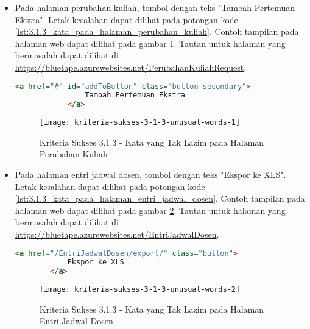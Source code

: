 \begin{itemize}
    \item Pada halaman perubahan kuliah, tombol dengan teks "Tambah Pertemuan Ekstra". Letak kesalahan dapat dilihat pada potongan kode \ref{lst:3.1.3_kata_pada_halaman_perubahan_kuliah}. Contoh tampilan pada halaman web dapat dilihat pada gambar \ref{fig:3.1.3_unusual_words_1}. Tautan untuk halaman yang bermasalah dapat dilihat di \url{https://bluetape.azurewebsites.net/PerubahanKuliahRequest}.
    \begin{lstlisting}[frame=single, label={lst:3.1.3_kata_pada_halaman_perubahan_kuliah}, language=HTML, caption=Kriteria Sukses 3.1.3 - Kata yang Tak Lazim pada Halaman Perubahan Kuliah]
            <a href="#" id="addToButton" class="button secondary">
                Tambah Pertemuan Ekstra
            </a>
    \end{lstlisting}
    
    \begin{figure}[H]
        \centering  
        \texttt{[image: kriteria-sukses-3-1-3-unusual-words-1]}  
        \caption[Kriteria Sukses 3.1.3 - Kata yang Tak Lazim pada Halaman Perubahan Kuliah]{Kriteria Sukses 3.1.3 - Kata yang Tak Lazim pada Halaman Perubahan Kuliah}
        \label{fig:3.1.3_unusual_words_1}  
    \end{figure}
    
    \item Pada halaman entri jadwal dosen, tombol dengan teks "Ekspor ke XLS". Letak kesalahan dapat dilihat pada potongan kode \ref{lst:3.1.3_kata_pada_halaman_entri_jadwal_dosen}. Contoh tampilan pada halaman web dapat dilihat pada gambar \ref{fig:3.1.3_unusual_words_2}. Tautan untuk halaman yang bermasalah dapat dilihat di \url{https://bluetape.azurewebsites.net/EntriJadwalDosen}.
    \begin{lstlisting}[frame=single, label={lst:3.1.3_kata_pada_halaman_entri_jadwal_dosen}, language=HTML, caption=Kriteria Sukses 3.1.3 - Kata yang Tak Lazim pada Halaman Entri Jadwal Dosen]
        <a href="/EntriJadwalDosen/export/" class="button">
            Ekspor ke XLS
        </a>
    \end{lstlisting}
    
    \begin{figure}[H]
        \centering  
        \texttt{[image: kriteria-sukses-3-1-3-unusual-words-2]}  
        \caption[Kriteria Sukses 3.1.3 - Kata yang Tak Lazim pada Halaman Entri Jadwal Dosen]{Kriteria Sukses 3.1.3 - Kata yang Tak Lazim pada Halaman Entri Jadwal Dosen}
        \label{fig:3.1.3_unusual_words_2}  
    \end{figure}


\end{itemize}
